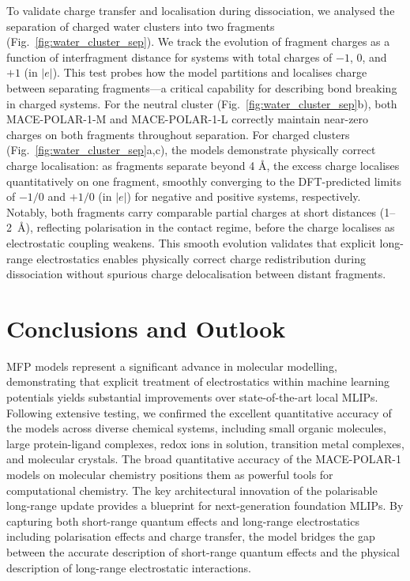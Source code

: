 \documentclass[aps,%
superscriptaddress,
 amsmath,amssymb,
floatfix,
twocolumn
]{revtex4-2}
\newcommand{\MFP}{MACE-POLAR-1 }
\newcommand{\MFPM}{MACE-POLAR-1-M }
\newcommand{\MFPL}{MACE-POLAR-1-L }
\begin{document}
To validate charge transfer and localisation during dissociation, we analysed the separation of charged water clusters into two fragments (Fig.~\ref{fig:water_cluster_sep}). We track the evolution of fragment charges as a function of interfragment distance for systems with total charges of $-1$, $0$, and $+1$ (in $|e|$). This test probes how the model partitions and localises charge between separating fragments—a critical capability for describing bond breaking in charged systems. For the neutral cluster
 (Fig.~\ref{fig:water_cluster_sep}b), both \MFPM and \MFPL correctly maintain near-zero charges on both fragments throughout separation. For charged clusters (Fig.~\ref{fig:water_cluster_sep}a,c), the models demonstrate physically correct charge localisation: as fragments separate beyond 4 Å, the excess charge localises quantitatively on one fragment, smoothly converging to the DFT-predicted limits of $-1/0$ and $+1/0$ (in $|e|$) for negative and positive systems, respectively. Notably, both fragments carry comparable partial charges at short distances (1--2~\AA), reflecting polarisation in the contact regime, before the charge localises as electrostatic coupling weakens. This smooth evolution validates that explicit long-range electrostatics enables physically correct charge redistribution during dissociation without spurious charge delocalisation between distant fragments.


\section{Conclusions and Outlook}

MFP models represent a significant advance in molecular modelling, demonstrating that explicit treatment of electrostatics within machine learning potentials yields substantial improvements over state-of-the-art local MLIPs. Following extensive testing, we confirmed the excellent quantitative accuracy of the models across diverse chemical systems, including small organic molecules, large protein-ligand complexes, redox ions in solution, transition metal complexes, and molecular crystals. The broad quantitative accuracy of the \MFP models on molecular chemistry positions them as powerful tools for computational chemistry.
%
The key architectural innovation of the polarisable long-range update provides a blueprint for next-generation foundation MLIPs. By capturing both short-range quantum effects and long-range electrostatics including polarisation effects and charge transfer, the model bridges the gap between the accurate description of short-range quantum effects and the physical description of long-range electrostatic interactions.
\end{document}
